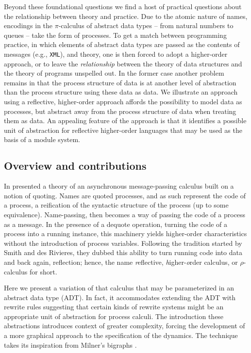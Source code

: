 \documentclass[]{entcs}
\newcommand{\pic}{$\pi$-calculus}
\begin{document}
Beyond these foundational questions we find a host of practical
questions about the relationship between theory and practice. Due to
the atomic nature of names, encodings in the {\pic} of abstract data
types -- from natural numbers to queues -- take the form of
processes. To get a match between programming practice, in which
elements of abstract data types are passed as the contents of messages
(e.g., \texttt{XML}), and theory, one is then forced to adopt a
higher-order approach, or to leave the \emph{relationship} between the theory
of data structures and the theory of programs unspelled out. In the
former case another problem remains in that the process structure of
data is at another level of abstraction than the process structure
using these data as data. We illustrate an approach using a
reflective, higher-order approach affords the possibility to model
data as processes, but abstract away from the process structure of
data when treating them as data. An appealing feature of the approach
is that it identifies a possible unit of abstraction for reflective
higher-order languages that may be used as the basis of a module
system.

\subsection{Overview and contributions} 

In \cite{MeredithRHO2005} presented a theory of an asynchronous
message-passing calculus built on a notion of quoting. Names are
quoted processes, and as such represent the code of a process, a
reification of the syntactic structure of the process (up to some
equivalence). Name-passing, then becomes a way of passing the code of
a process as a message. In the presence of a dequote operation,
turning the code of a process into a running instance, this machinery
yields higher-order characteristics without the introduction of
process variables. Following the tradition started by Smith and des
Rivieres, \cite{lisp3} they dubbed this ability to turn running code into
data and back again, reflection; hence, the name \textit{r}eflective,
\textit{h}igher-\textit{o}rder calculus, or $\rho$-calculus for short.

Here we present a variation of that calculus that may be parameterized
in an abstract data type (ADT). In fact, it accommodates extending the
ADT with rewrite rules suggesting that certain kinds of rewrite
systems might be an appropriate unit of abstraction for process
calculi. The introduction these abstractions introduces context of
greater complexity, forcing the development of a more graphical
approach to the specification of the dynamics. The technique takes its
inspiration from Milner's bigraphs
\cite{DBLP:conf/popl/JensenM03}.
\end{document}
